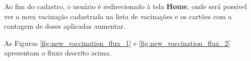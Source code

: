 Ao fim do cadastro, o usuário é redirecionado à tela \textbf{Home}, onde será possível ver a nova vacinação cadastrada na lista de vacinações e os cartões com a contagem de doses aplicadas aumentar.

As Figuras \ref{fig:new_vaccination_flux_1} e \ref{fig:new_vaccination_flux_2} apresentam o fluxo descrito acima.

\begin{figure}[ht!]
  \centering
            \qquad
            \qquad

\end{figure}
